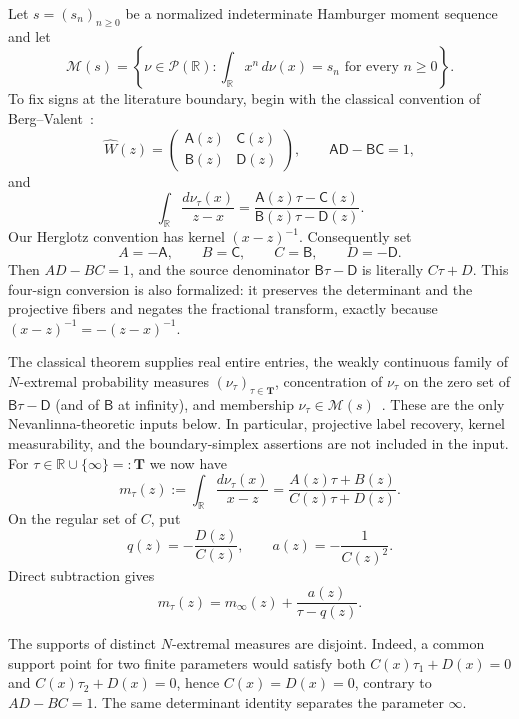 \documentclass[11pt]{article}
\newcommand{\R}{\mathbb R}
\newcommand{\cM}{\mathcal M}
\newcommand{\cP}{\mathcal P}
\begin{document}
Let $s=(s_n)_{n\geq0}$ be a normalized indeterminate Hamburger moment sequence and let
\[
  \cM(s)=\left\{\nu\in\cP(\R):\int_{\R}x^n\,d\nu(x)=s_n
  \text{ for every }n\geq0\right\}.
\]
To fix signs at the literature boundary, begin with the classical convention of
Berg--Valent~\cite[\S2.1]{BergValent1994}:
\[
 \widehat W(z)=
 \begin{pmatrix}\mathsf A(z)&\mathsf C(z)\\
                 \mathsf B(z)&\mathsf D(z)\end{pmatrix},
 \qquad \mathsf A\mathsf D-\mathsf B\mathsf C=1,
\]
and
\[
 \int_{\R}\frac{d\nu_\tau(x)}{z-x}
   =\frac{\mathsf A(z)\tau-\mathsf C(z)}
          {\mathsf B(z)\tau-\mathsf D(z)}.
\]
Our Herglotz convention has kernel $(x-z)^{-1}$.  Consequently set
\[
  A=-\mathsf A,\qquad B=\mathsf C,\qquad
  C=\mathsf B,\qquad D=-\mathsf D.
\]
Then $AD-BC=1$, and the source denominator
$\mathsf B\tau-\mathsf D$ is literally $C\tau+D$.  This four-sign conversion is also
formalized: it preserves the determinant and the projective fibers and negates the fractional
transform, exactly because $(x-z)^{-1}=-(z-x)^{-1}$.

The classical theorem supplies real entire entries, the weakly continuous family of
$N$-extremal probability measures $(\nu_\tau)_{\tau\in\mathbf T}$, concentration of
$\nu_\tau$ on the zero set of $\mathsf B\tau-\mathsf D$ (and of $\mathsf B$ at infinity),
and membership $\nu_\tau\in\cM(s)$~\cite{Akhiezer1965,BergValent1994,PrucknerEtAl2023}.
These are the only Nevanlinna-theoretic inputs below.  In particular, projective label recovery,
kernel measurability, and the boundary-simplex assertions are not included in the input.
For $\tau\in\R\cup\{\infty\}=:\mathbf T$ we now have
\begin{equation}\label{eq:nev-family}
  m_\tau(z):=\int_{\R}\frac{d\nu_\tau(x)}{x-z}
  =\frac{A(z)\tau+B(z)}{C(z)\tau+D(z)}.
\end{equation}
On the regular set of $C$, put
\begin{equation}\label{eq:q}
  q(z)=-\frac{D(z)}{C(z)},\qquad
  a(z)=-\frac{1}{C(z)^2}.
\end{equation}
Direct subtraction gives
\begin{equation}\label{eq:mobius-difference}
  m_\tau(z)=m_\infty(z)+\frac{a(z)}{\tau-q(z)}.
\end{equation}

The supports of distinct $N$-extremal measures are disjoint.  Indeed, a common support point for
two finite parameters would satisfy both $C(x)\tau_1+D(x)=0$ and
$C(x)\tau_2+D(x)=0$, hence $C(x)=D(x)=0$, contrary to
$AD-BC=1$.  The same determinant identity separates the parameter $\infty$.
\end{document}
